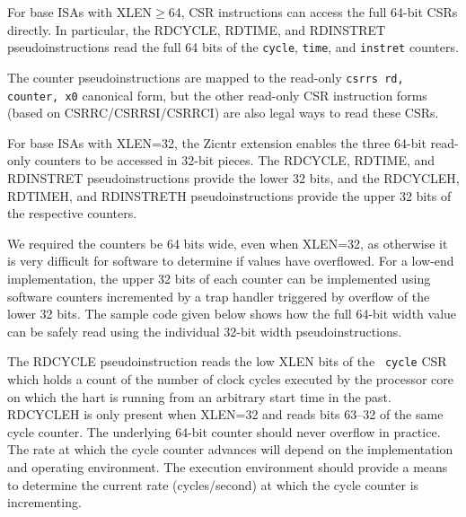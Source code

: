 For base ISAs with XLEN$\geq$64, CSR instructions can access the full
64-bit CSRs directly.  In particular, the RDCYCLE, RDTIME, and
RDINSTRET pseudoinstructions read the full 64 bits of the {\tt cycle},
{\tt time}, and {\tt instret} counters.

\begin{commentary}
The counter pseudoinstructions are mapped to the read-only {\tt csrrs
  rd, counter, x0} canonical form, but the other read-only CSR
instruction forms (based on CSRRC/CSRRSI/CSRRCI) are also legal ways
to read these CSRs.
\end{commentary}

For base ISAs with XLEN=32, the Zicntr extension enables the three
64-bit read-only counters to be accessed in 32-bit pieces.
The RDCYCLE, RDTIME, and RDINSTRET pseudoinstructions provide the lower 32
bits, and the RDCYCLEH, RDTIMEH, and RDINSTRETH pseudoinstructions provide
the upper 32 bits of the respective counters.

\begin{commentary}
We required the counters be 64 bits wide, even when XLEN=32, as otherwise
it is very difficult for software to determine if values have
overflowed.  For a low-end implementation, the upper 32 bits of each
counter can be implemented using software counters incremented by a
trap handler triggered by overflow of the lower 32 bits.  The sample
code given below shows how the full 64-bit width value can be
safely read using the individual 32-bit width pseudoinstructions.
\end{commentary}

The RDCYCLE pseudoinstruction reads the low XLEN bits of the {\tt
  cycle} CSR which holds a count of the number of clock cycles
executed by the processor core on which the hart is running from an
arbitrary start time in the past.  RDCYCLEH is only present when
XLEN=32 and reads bits 63--32 of the same cycle
counter.  The underlying 64-bit counter should never overflow in
practice.  The rate at which the cycle counter advances will depend on
the implementation and operating environment.  The execution
environment should provide a means to determine the current rate
(cycles/second) at which the cycle counter is incrementing.

